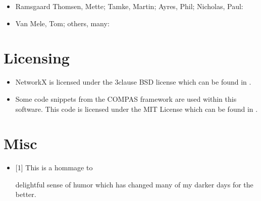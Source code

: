 \documentclass[letterpaper,10pt,english]{sphinxmanual}
\begin{document}
\begin{itemize}
\item {} 
Ramsgaard Thomsen, Mette; Tamke, Martin; Ayres, Phil; Nicholas, Paul:
%
\begin{footnote}[44]\sphinxAtStartFootnote
{}
%
\end{footnote}

\item {} 
Van Mele, Tom; others, many: %
\begin{footnote}[45]\sphinxAtStartFootnote
{}
%
\end{footnote}

\end{itemize}


\section{Licensing}
\label{\detokenize{README:licensing}}\begin{itemize}
\item {} 
NetworkX is licensed under the 3\sphinxhyphen{}clause BSD license which can be
found in .

\item {} 
Some code snippets from the COMPAS framework are used within this
software. This code is licensed under the MIT License which can be
found in .

\end{itemize}


\section{Misc}
\label{\detokenize{README:misc}}\begin{itemize}
\item {} 
{[}1{]} This is a hommage to %
\begin{footnote}[46]\sphinxAtStartFootnote
{}
%
\end{footnote} delightful
sense of humor which has changed many of my darker days for the
better.

\end{itemize}
\label{\detokenize{cockatoo:module-cockatoo}}
\end{document}

